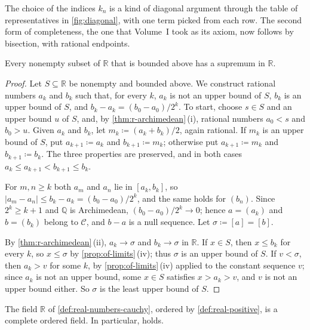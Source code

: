 The choice of the indices $k_n$ is a kind of diagonal argument through the table of representatives in \cref{fig:diagonal}, with one term picked from each row. The second form of completeness, the one that Volume~I took as its axiom, now follows by bisection, with rational endpoints.

\begin{theorem}
\label{thm:r-sup}
Every nonempty subset of $\mathbb R$ that is bounded above has a supremum in $\mathbb R$.
\end{theorem}

\begin{proof}
Let $S\subseteq\mathbb R$ be nonempty and bounded above. We construct rational numbers $a_k$ and $b_k$ such that, for every $k$, $a_k$ is not an upper bound of $S$, $b_k$ is an upper bound of $S$, and $b_k-a_k=(b_0-a_0)/2^k$. To start, choose $s\in S$ and an upper bound $u$ of $S$, and, by \cref{thm:r-archimedean}\,(i), rational numbers $a_0<s$ and $b_0>u$. Given $a_k$ and $b_k$, let $m_k\coloneqq(a_k+b_k)/2$, again rational. If $m_k$ is an upper bound of $S$, put $a_{k+1}\coloneqq a_k$ and $b_{k+1}\coloneqq m_k$; otherwise put $a_{k+1}\coloneqq m_k$ and $b_{k+1}\coloneqq b_k$. The three properties are preserved, and in both cases $a_k\le a_{k+1}<b_{k+1}\le b_k$.

For $m,n\ge k$ both $a_m$ and $a_n$ lie in $[a_k,b_k]$, so $|a_m-a_n|\le b_k-a_k=(b_0-a_0)/2^k$, and the same holds for $(b_n)$. Since $2^k\ge k+1$ and $\mathbb Q$ is Archimedean, $(b_0-a_0)/2^k\to0$; hence $a=(a_k)$ and $b=(b_k)$ belong to $\mathcal C$, and $b-a$ is a null sequence. Let $\sigma\coloneqq[a]=[b]$.

By \cref{thm:r-archimedean}\,(ii), $a_k\to\sigma$ and $b_k\to\sigma$ in $\mathbb R$. If $x\in S$, then $x\le b_k$ for every $k$, so $x\le\sigma$ by \cref{prop:of-limits}\,(iv); thus $\sigma$ is an upper bound of $S$. If $v<\sigma$, then $a_k>v$ for some $k$, by \cref{prop:of-limits}\,(iv) applied to the constant sequence $v$; since $a_k$ is not an upper bound, some $x\in S$ satisfies $x>a_k>v$, and $v$ is not an upper bound either. So $\sigma$ is the least upper bound of $S$.
\end{proof}

\begin{theorem}
\label{thm:reals-exist}
The field $\mathbb R$ of \cref{def:real-numbers-cauchy}, ordered by \cref{def:real-positive}, is a complete ordered field. In particular,  holds.
\end{theorem}

